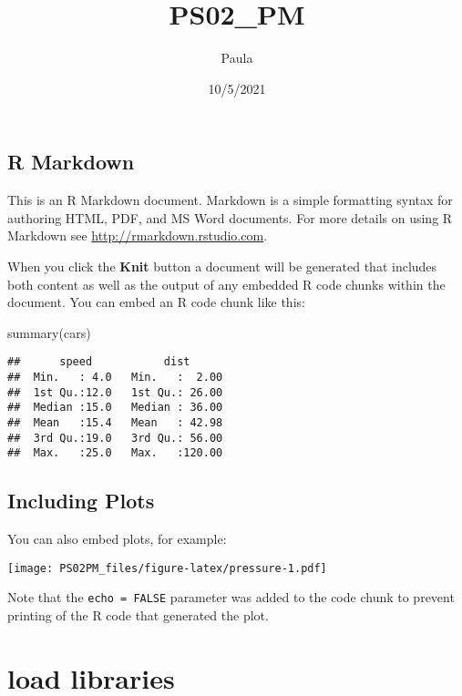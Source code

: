 \documentclass[
]{article}
\title{PS02\_PM}
\author{Paula}
\date{10/5/2021}
\newenvironment{Shaded}{\begin{snugshade}}{\end{snugshade}}
\newcommand{\FunctionTok}[1]{\textcolor[rgb]{0.00,0.00,0.00}{#1}}
\newcommand{\NormalTok}[1]{#1}
\begin{document}
\maketitle

\hypertarget{r-markdown}{%
\subsection{R Markdown}\label{r-markdown}}

This is an R Markdown document. Markdown is a simple formatting syntax
for authoring HTML, PDF, and MS Word documents. For more details on
using R Markdown see \url{http://rmarkdown.rstudio.com}.

When you click the \textbf{Knit} button a document will be generated
that includes both content as well as the output of any embedded R code
chunks within the document. You can embed an R code chunk like this:

\begin{Shaded}
\begin{Highlighting}[]
\FunctionTok{summary}\NormalTok{(cars)}
\end{Highlighting}
\end{Shaded}

\begin{verbatim}
##      speed           dist       
##  Min.   : 4.0   Min.   :  2.00  
##  1st Qu.:12.0   1st Qu.: 26.00  
##  Median :15.0   Median : 36.00  
##  Mean   :15.4   Mean   : 42.98  
##  3rd Qu.:19.0   3rd Qu.: 56.00  
##  Max.   :25.0   Max.   :120.00
\end{verbatim}

\hypertarget{including-plots}{%
\subsection{Including Plots}\label{including-plots}}

You can also embed plots, for example:

\texttt{[image: PS02PM\_files/figure-latex/pressure-1.pdf]}

Note that the \texttt{echo\ =\ FALSE} parameter was added to the code
chunk to prevent printing of the R code that generated the plot.

\hypertarget{load-libraries}{%
\section{load libraries}\label{load-libraries}}
\end{document}
